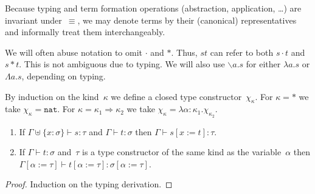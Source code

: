 \documentclass[runningheads,a4paper]{llncs}
\newcommand{\arrkind}{\Rightarrow}
\newcommand{\abs}[2]{\lambda #1.#2}
\newcommand{\tabs}[2]{\Lambda #1.#2}
\newcommand{\abstraction}[2]{\backslash #1.#2}
\newcommand{\app}[2]{#1 \cdot #2}
\newcommand{\tapp}[2]{#1 * #2}
\newcommand{\subst}[2]{#1:=#2}
\newcommand{\nat}{\mathtt{nat}}
\newcommand{\proves}{\vdash}
\begin{document}
Because typing and term formation operations (abstraction,
application, \ldots) are invariant under~$\equiv$, we may denote terms
by their (canonical) representatives and informally treat them
interchangeably.

We will often abuse notation to omit $\cdot$ and $*$. Thus, $s t$ can
refer to both $\app{s}{t}$ and $\tapp{s}{t}$. This is not ambiguous
due to typing. We will also use $\abstraction{a}{s}$ for either
$\abs{a}{s}$ or $\tabs{a}{s}$, depending on typing.

\begin{definition}\label{def_chi_kappa}\normalfont
  By induction on the kind~$\kappa$ we define a closed type
  constructor~$\chi_\kappa$. For $\kappa=*$ we take $\chi_\kappa =
  \nat$. For $\kappa=\kappa_1\arrkind\kappa_2$ we take $\chi_\kappa =
  \lambda \alpha:\kappa_1 . \chi_{\kappa_2}$.
\end{definition}

\begin{lemma}
  \begin{enumerate}
  \item If $\Gamma \uplus \{ x : \sigma \} \vdash s : \tau$ and
    $\Gamma \proves t : \sigma$ then
    $\Gamma \proves s[\subst{x}{t}] : \tau$.
  \item If $\Gamma \proves t : \sigma$ and~$\tau$ is a type
    constructor of the same kind as the variable~$\alpha$ then
    $\Gamma[\subst{\alpha}{\tau}] \proves t[\subst{\alpha}{\tau}] :
    \sigma[\subst{\alpha}{\tau}]$.
  \end{enumerate}
\end{lemma}

\begin{proof}
  Induction on the typing derivation.
\end{proof}
\end{document}
